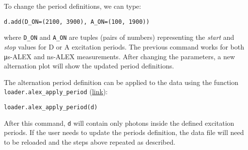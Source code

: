 
To change the period definitions, we can type:

\begin{lstlisting}
d.add(D_ON=(2100, 3900), A_ON=(100, 1900))
\end{lstlisting}

\noindent where \verb|D_ON| and \verb|A_ON| are tuples (pairs of numbers) representing
the \textit{start} and \textit{stop} values for D or A excitation periods.
The previous command works for both μs-ALEX and ns-ALEX measurements.
After changing the parameters, a new alternation plot will show the updated
period definitions.

The alternation period definition can be applied to the data
using the function \verb|loader.alex_apply_period|
(\href{http://fretbursts.readthedocs.org/en/latest/loader.html#fretbursts.loader.alex_apply_period}{link}):

\begin{lstlisting}
loader.alex_apply_period(d)
\end{lstlisting}

After this command, \verb|d| will contain only photons inside the defined excitation periods.
If the user needs to update the periods definition, the data file will need to be
reloaded and the steps above repeated as described.
